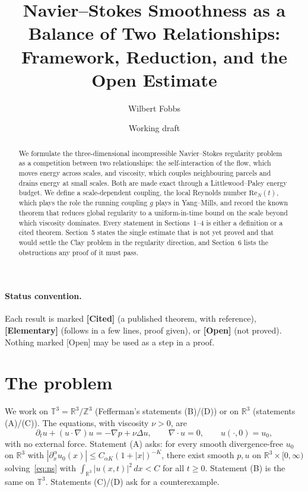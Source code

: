 \documentclass[11pt]{article}
\title{Navier--Stokes Smoothness as a Balance of Two Relationships:\\
Framework, Reduction, and the Open Estimate}
\author{Wilbert Fobbs}
\date{Working draft}
\theoremstyle{definition}
\theoremstyle{remark}
\newcommand{\R}{\mathbb{R}}
\newcommand{\T}{\mathbb{T}}
\renewcommand{\Re}{\mathrm{Re}}
\begin{document}
\maketitle

\begin{abstract}
We formulate the three-dimensional incompressible Navier--Stokes regularity
problem as a competition between two relationships: the self-interaction of
the flow, which moves energy across scales, and viscosity, which couples
neighbouring parcels and drains energy at small scales. Both are made exact
through a Littlewood--Paley energy budget. We define a scale-dependent
coupling, the local Reynolds number $\Re_N(t)$, which plays the role the
running coupling $g$ plays in Yang--Mills, and record the known theorem that
reduces global regularity to a uniform-in-time bound on the scale beyond
which viscosity dominates. Every statement in Sections~1--4 is either a
definition or a cited theorem. Section~5 states the single estimate that is
not yet proved and that would settle the Clay problem in the regularity
direction, and Section~6 lists the obstructions any proof of it must pass.
\end{abstract}

\paragraph{Status convention.}
Each result is marked \textbf{[Cited]} (a published theorem, with
reference), \textbf{[Elementary]} (follows in a few lines, proof given), or
\textbf{[Open]} (not proved). Nothing marked [Open] may be used as a step
in a proof.

\section{The problem}

We work on $\T^3 = \R^3/\mathbb{Z}^3$ (Fefferman's statements (B)/(D)) or on
$\R^3$ (statements (A)/(C)). The equations, with viscosity $\nu>0$, are
\begin{equation}\label{eq:ns}
\partial_t u + (u\cdot\nabla)u = -\nabla p + \nu\Delta u,
\qquad \nabla\cdot u = 0, \qquad u(\cdot,0)=u_0,
\end{equation}
with no external force. Statement (A) asks: for every smooth divergence-free
$u_0$ on $\R^3$ with $|\partial_x^\alpha u_0(x)| \le C_{\alpha K}(1+|x|)^{-K}$,
there exist smooth $p,u$ on $\R^3\times[0,\infty)$ solving~\eqref{eq:ns}
with $\int_{\R^3}|u(x,t)|^2\,dx < C$ for all $t\ge 0$. Statement (B) is the
same on $\T^3$. Statements (C)/(D) ask for a counterexample.
\end{document}
